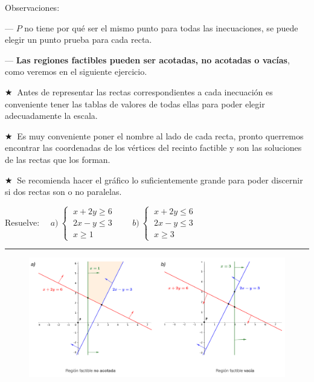 Observaciones:

--- $P$ no tiene por qué ser el mismo punto para todas las inecuaciones, se puede elegir un punto prueba para cada recta.

--- \textbf{Las regiones factibles pueden ser acotadas, no acotadas o vacías}, como veremos en el siguiente ejercicio.

\vspace{15mm} %

\begin{destacado}
$\bigstar \ $ Antes de representar las rectas correspondientes a cada inecuación es conveniente tener las tablas de valores de todas ellas para poder elegir adecuadamente la escala. 

$\bigstar \ $ Es muy conveniente poner el nombre al lado de cada recta, pronto querremos encontrar las coordenadas de los vértices del recinto factible y son las soluciones de las rectas que los forman.

$\bigstar \ $ Se recomienda hacer el gráfico	lo suficientemente grande para poder discernir si dos rectas son o no paralelas.
\end{destacado}

\vspace{15mm} %
\begin{ejemplo}
\begin{ejre}
Resuelve: $\quad a) \ \begin{cases}
 \ x+2y\ge 6\\ \ 2x-y\le 3	\\ \ x\ge 1
 \end{cases} \qquad
 b) \ \begin{cases}
  \ x+2y\le 6\\ \ 2x-y\le 3	\\ \ x\ge 3
 \end{cases}$
\end{ejre}

\vspace{3mm}
\rule{150pt}{0.1pt}
\vspace{3mm}

\end{ejemplo}


\begin{figure}[H]
	\centering
	\includegraphics[width=1\textwidth]{imagenes/img09.png}
\end{figure}


